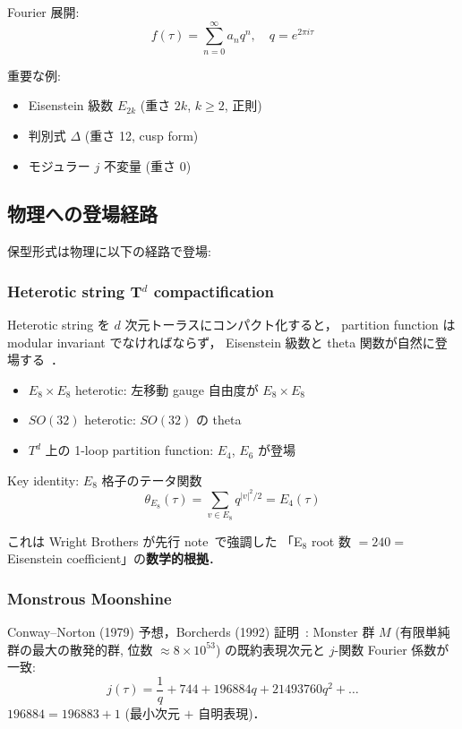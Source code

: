 \documentclass[11pt,a4paper]{article}
\begin{document}
Fourier 展開:
\begin{equation}
f(\tau) = \sum_{n=0}^\infty a_n q^n, \quad q = e^{2\pi i \tau}
\end{equation}

重要な例:
\begin{itemize}
\item Eisenstein 級数 $E_{2k}$ (重さ $2k$, $k \geq 2$, 正則)
\item 判別式 $\Delta$ (重さ 12, cusp form)
\item モジュラー $j$ 不変量 (重さ 0)
\end{itemize}

\subsection{物理への登場経路}

保型形式は物理に以下の経路で登場:

\subsubsection{Heterotic string T$^d$ compactification}

Heterotic string を $d$ 次元トーラスにコンパクト化すると，
partition function は modular invariant でなければならず，
Eisenstein 級数と theta 関数が自然に登場する~\cite{GSW1987}．

\begin{itemize}
\item $E_8 \times E_8$ heterotic: 左移動 gauge 自由度が $E_8 \times E_8$
\item $SO(32)$ heterotic: $SO(32)$ の theta
\item $T^d$ 上の 1-loop partition function: $E_4$, $E_6$ が登場
\end{itemize}

Key identity: $E_8$ 格子のテータ関数
\begin{equation}
\theta_{E_8}(\tau) = \sum_{v \in E_8} q^{|v|^2/2} = E_4(\tau)
\end{equation}

これは Wright Brothers が先行 note~\cite{wb-spec-z}で強調した
「E$_8$ root 数 $= 240 =$ Eisenstein coefficient」の\textbf{数学的根拠}．

\subsubsection{Monstrous Moonshine}

Conway--Norton (1979) 予想，Borcherds (1992) 証明~\cite{Borcherds1992}:
Monster 群 $M$ (有限単純群の最大の散発的群, 位数 $\approx 8 \times 10^{53}$)
の既約表現次元と $j$-関数 Fourier 係数が一致:
\begin{equation}
j(\tau) = \frac{1}{q} + 744 + 196884 q + 21493760 q^2 + \ldots
\end{equation}
$196884 = 196883 + 1$ (最小次元 $+$ 自明表現)．
\end{document}
